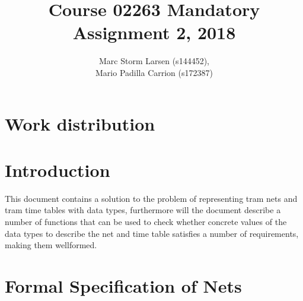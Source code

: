 \documentclass[a4]{article}
\title{Course 02263 Mandatory Assignment 2, 2018}
\author{Marc Storm Larsen (s144452),\\ 
        Mario Padilla Carrion (s172387)}
\begin{document}
\maketitle

\tableofcontents
\newpage

\section{Work distribution}

\section{Introduction}
This document contains a solution to the problem of representing tram nets and tram time tables with data types, furthermore will the document describe a number of functions that can be used to check whether concrete values of the data types to describe the net and time table satisfies a number of requirements, making them wellformed.

\section{Formal Specification of Nets}


\end{document}
